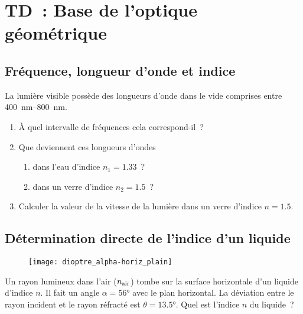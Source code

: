 \documentclass[../main/main.tex]{subfiles}
\begin{document}
\setcounter{chapter}{1}

\chapter{TD~: Base de l'optique g\'eom\'etrique}

\section{Fréquence, longueur d'onde et indice}
La lumière visible possède des longueurs d'onde dans le vide comprises entre
\SIrange{400}{800}{nm}.
\begin{enumerate}
	\item À quel intervalle de fréquences cela correspond-il~?
	\item Que deviennent ces longueurs d'ondes
	      \begin{enumerate}
		      \item dans l'eau d'indice $n_1 = \num{1.33}$~?
		      \item dans un verre d'indice $n_2 = \num{1.5}$~?
	      \end{enumerate}
	\item Calculer la valeur de la vitesse de la lumière dans un verre d'indice
	      $n = \num{1.5}$.
\end{enumerate}

\section{Détermination directe de l'indice d'un liquide}
\begin{wrapfigure}[4]{R}{.3\linewidth}
	\vspace*{-1.5cm}
	\centering
	\texttt{[image: dioptre\_alpha-horiz\_plain]}
	\label{fig:alpha_horiz}
\end{wrapfigure}
\vspace{1cm}
Un rayon lumineux dans l'air ($n_{\rm air}$) tombe sur la surface horizontale
d'un liquide d'indice $n$. Il fait un angle $\alpha = \ang{56;;}$ avec le plan
horizontal. La déviation entre le rayon incident et le rayon réfracté est
$\theta = \ang{13.5;;}$. Quel est l'indice $n$ du liquide~?
\vspace{1cm}
\end{document}
